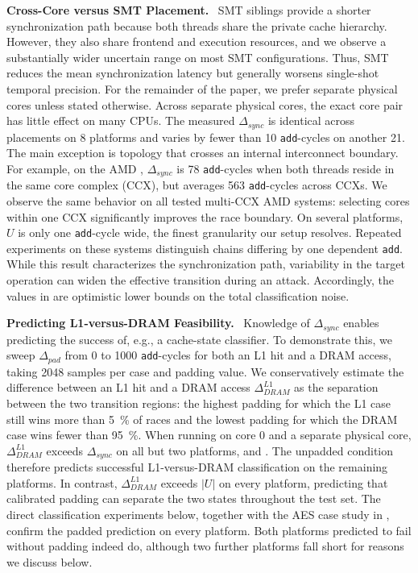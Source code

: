 \documentclass[letterpaper,twocolumn,10pt]{article} %
\newcommand{\paragrabf}[1]{\noindent \textbf{#1.}\ }
\newcommand{\rdelta}[1]{$\Delta_{#1}$}
\begin{document}
\paragrabf{Cross-Core versus SMT Placement}
SMT siblings provide a shorter synchronization path because both threads share the private cache hierarchy.
However, they also share frontend and execution resources, and we observe a substantially wider uncertain range on most SMT configurations.
Thus, SMT reduces the mean synchronization latency but generally worsens single-shot temporal precision.
For the remainder of the paper, we prefer separate physical cores unless stated otherwise.
Across separate physical cores, the exact core pair has little effect on many CPUs.
The measured \rdelta{sync} is identical across placements on \num{8} platforms and varies by fewer than \num{10} \texttt{add}-cycles on another \num{21}.
The main exception is topology that crosses an internal interconnect boundary.
For example, on the AMD \labthirtyCPU, \rdelta{sync} is \num{78} \texttt{add}-cycles when both threads reside in the same core complex (CCX), but averages \num{563} \texttt{add}-cycles across CCXs.
We observe the same behavior on all tested multi-CCX AMD systems: selecting cores within one CCX significantly improves the race boundary.
On several platforms, $U$ is only one \texttt{add}-cycle wide, the finest granularity our setup resolves.
Repeated experiments on these systems distinguish chains differing by one dependent \texttt{add}.
While this result characterizes the synchronization path, variability in the target operation can widen the effective transition during an attack.
Accordingly, the values in  are optimistic lower bounds on the total classification noise.

\paragrabf{Predicting L1-versus-DRAM Feasibility}
Knowledge of \rdelta{sync} enables predicting the success of, e.g., a cache-state classifier.
To demonstrate this, we sweep \rdelta{pad} from \num{0} to \num{1000} \texttt{add}-cycles for both an L1 hit and a DRAM access, taking \num{2048} samples per case and padding value.
We conservatively estimate the difference between an L1 hit and a DRAM access $\Delta^{L1}_{DRAM}$ as the separation between the two transition regions: the highest padding for which the L1 case still wins more than \SI{5}{\percent} of races and the lowest padding for which the DRAM case wins fewer than \SI{95}{\percent}.
When running on core 0 and a separate physical core, $\Delta^{L1}_{DRAM}$ exceeds \rdelta{sync} on all but two platforms, \labfourtyfourCPU and \labeightythreeCPU.
The unpadded condition therefore predicts successful L1-versus-DRAM classification on the remaining platforms.
In contrast, $\Delta^{L1}_{DRAM}$ exceeds $|U|$ on every platform, predicting that calibrated padding can separate the two states throughout the test set.
The direct classification experiments below, together with the AES case study in , confirm the padded prediction on every platform.
Both platforms predicted to fail without padding indeed do, although two further platforms fall short for reasons we discuss below.
\end{document}
